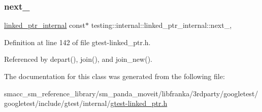 \subsubsection{\texorpdfstring{next\+\_\+}{next\_}}
{\footnotesize\ttfamily \hyperlink{classtesting_1_1internal_1_1linked__ptr__internal}{linked\+\_\+ptr\+\_\+internal} const$\ast$ testing\+::internal\+::linked\+\_\+ptr\+\_\+internal\+::next\+\_\+\hspace{0.3cm}{\ttfamily [mutable]}, {\ttfamily [private]}}



Definition at line 142 of file gtest-\/linked\+\_\+ptr.\+h.



Referenced by depart(), join(), and join\+\_\+new().



The documentation for this class was generated from the following file\+:\begin{DoxyCompactItemize}
\item 
smacc\+\_\+sm\+\_\+reference\+\_\+library/sm\+\_\+panda\+\_\+moveit/libfranka/3rdparty/googletest/googletest/include/gtest/internal/\hyperlink{gtest-linked__ptr_8h}{gtest-\/linked\+\_\+ptr.\+h}\end{DoxyCompactItemize}
